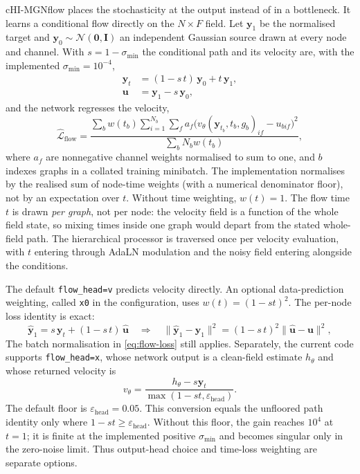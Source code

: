 cHI-MGNflow places the stochasticity at the output instead of in a bottleneck.
It learns a conditional flow directly on the $N\times F$ field. Let
$\mathbf{y}_1$ be the normalised target and
$\mathbf{y}_0\sim\mathcal{N}(\mathbf{0},\mathbf{I})$ an independent Gaussian
source drawn at every node and channel. With $s=1-\sigma_{\min}$ the
conditional path and its velocity are, with the implemented
$\sigma_{\min}=10^{-4}$,
\begin{align}
  \mathbf{y}_t &= (1-s\,t)\,\mathbf{y}_0 + t\,\mathbf{y}_1,
  \label{eq:flow-path}\\
  \mathbf{u}   &= \mathbf{y}_1 - s\,\mathbf{y}_0 ,
  \label{eq:flow-target}
\end{align}
and the network regresses the velocity,
\begin{equation}
  \widehat{\mathcal{L}}_{\mathrm{flow}}
  = \frac{\sum_b w(t_b)\sum_{i=1}^{N_b}\sum_f a_f
    \bigl(v_\theta(\mathbf{y}_{t_b},t_b,g_b)_{if}-u_{bif}\bigr)^2}
    {\sum_b N_b w(t_b)} ,
  \label{eq:flow-loss}
\end{equation}
where $a_f$ are nonnegative channel weights normalised to sum to one, and
$b$ indexes graphs in a collated training minibatch. The implementation normalises by the
realised sum of node-time weights (with a numerical denominator floor), not
by an expectation over $t$. Without time weighting, $w(t)=1$. The flow time
$t$ is drawn \emph{per graph}, not per node: the velocity field
is a function of the whole field state, so mixing times inside one graph would
depart from the stated whole-field path. The hierarchical
processor is traversed once per velocity evaluation, with $t$ entering through
AdaLN modulation and the noisy field entering alongside the conditions.

The default \texttt{flow\_head=v} predicts velocity directly. An optional
data-prediction weighting, called \texttt{x0} in the configuration, uses
$w(t)=(1-st)^2$. The per-node loss identity is exact:
\begin{equation}
  \hat{\mathbf{y}}_1 = s\,\mathbf{y}_t + (1-s\,t)\,\hat{\mathbf{u}}
  \quad\Longrightarrow\quad
  \bigl\|\hat{\mathbf{y}}_1-\mathbf{y}_1\bigr\|^2
  = (1-s\,t)^2\bigl\|\hat{\mathbf{u}}-\mathbf{u}\bigr\|^2 ,
  \label{eq:x0-equiv}
\end{equation}
The batch normalisation in \eqref{eq:flow-loss} still applies. Separately,
the current code supports \texttt{flow\_head=x}, whose network output is a
clean-field estimate $h_\theta$ and whose returned velocity is
\begin{equation}
 v_\theta = \frac{h_\theta-s\mathbf{y}_t}
 {\max(1-st,\varepsilon_{\mathrm{head}})} .
 \label{eq:flow-x-head}
\end{equation}
The default floor is $\varepsilon_{\mathrm{head}}=0.05$. This conversion
equals the unfloored path identity only where $1-st\geq
\varepsilon_{\mathrm{head}}$. Without this floor, the gain reaches $10^4$ at
$t=1$; it is finite at the implemented positive $\sigma_{\min}$ and becomes
singular only in the zero-noise limit. Thus output-head choice and time-loss
weighting are separate options.

